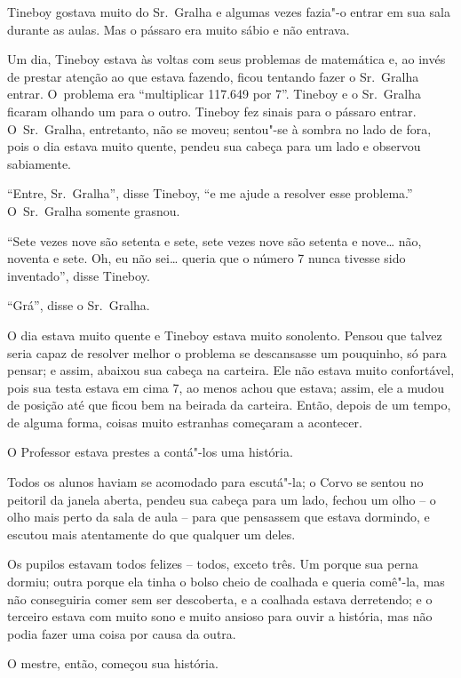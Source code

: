 Tineboy gostava muito do Sr.~Gralha e algumas vezes fazia"-o
entrar em sua sala durante as aulas. Mas o pássaro era muito sábio e não
entrava.

Um dia, Tineboy estava às voltas com seus problemas de matemática e, ao
invés de prestar atenção ao que estava fazendo, ficou tentando fazer o
Sr.~Gralha entrar. O~problema era ``multiplicar 117.649 por 7''. Tineboy
e o Sr.~Gralha ficaram olhando um para o outro. Tineboy fez sinais para
o pássaro entrar. O~Sr.~Gralha, entretanto, não se moveu; sentou"-se
à sombra no lado de fora, pois o dia estava muito quente, pendeu sua
cabeça para um lado e observou sabiamente.

``Entre, Sr.~Gralha'', disse Tineboy, ``e me ajude a resolver esse
problema.'' O~Sr.~Gralha somente grasnou.


``Sete vezes nove são setenta e sete, sete vezes nove são setenta e
nove\ldots{} não, noventa e sete. Oh, eu não sei\ldots{} queria que o
número 7 nunca tivesse sido inventado'', disse Tineboy.

``Grá'', disse o Sr.~Gralha.

O dia estava muito quente e Tineboy estava muito sonolento. Pensou
que talvez seria capaz de resolver melhor o problema se descansasse
um pouquinho, só para pensar; e assim, abaixou sua cabeça na carteira.
Ele não estava muito confortável, pois sua testa estava em cima 7, ao menos
achou que estava; assim, ele a mudou de posição até que ficou bem na
beirada da carteira. Então, depois de um tempo, de alguma forma, coisas
muito estranhas começaram a acontecer.

O Professor estava prestes a contá"-los uma história.

Todos os alunos haviam se acomodado para escutá"-la; o Corvo se sentou no
peitoril da janela aberta, pendeu sua cabeça para um lado, fechou um
olho -- o olho mais perto da sala de aula -- para que pensassem que
estava dormindo, e escutou mais atentamente do que qualquer um deles.


Os pupilos estavam todos felizes -- todos, exceto três. Um porque sua
perna dormiu; outra porque ela tinha o bolso cheio de coalhada e queria
comê"-la, mas não conseguiria comer sem ser descoberta, e a coalhada
estava derretendo; e o terceiro estava com muito sono e muito ansioso
para ouvir a história, mas não podia fazer uma coisa por causa da outra.

O mestre, então, começou sua história.

